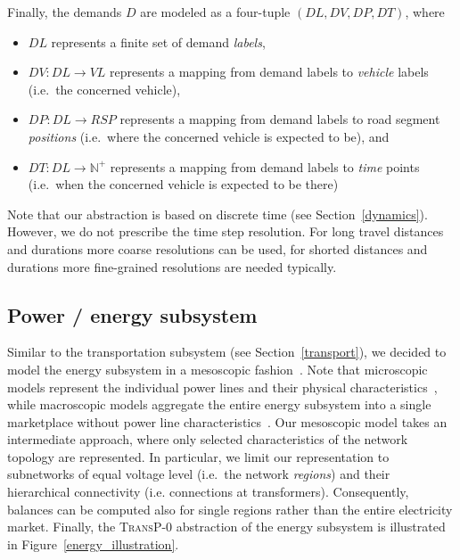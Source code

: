 Finally, the demands $D$ are modeled as a four-tuple $(DL, DV, DP, DT)$, where
\begin{itemize}
	\item $DL$ represents a finite set of demand \textit{labels},
	\item $DV: DL \rightarrow VL$ represents a mapping from demand labels to \textit{vehicle} labels (i.e.\ the concerned vehicle),
	\item $DP: DL \rightarrow RSP$ represents a mapping from demand labels to road segment \textit{positions} (i.e.\ where the concerned vehicle is expected to be), and
	\item $DT: DL \rightarrow \mathbb{N}^+$ represents a mapping from demand labels to \textit{time} points (i.e.\ when the concerned vehicle is expected to be there)
\end{itemize}
Note that our abstraction is based on discrete time (see Section~\ref{dynamics}). However, we do not prescribe the time step resolution. For long travel distances and durations more coarse resolutions can be used, for shorted distances and durations more fine-grained resolutions are needed typically.

\subsection{Power / energy subsystem}
\label{energy_system}

Similar to the transportation subsystem (see Section~\ref{transport}), we decided to model the energy subsystem in a mesoscopic fashion~\cite{Hackenberg2012}. Note that microscopic models represent the individual power lines and their physical characteristics~\cite{Dommel1968}, while macroscopic models aggregate the entire energy subsystem into a single marketplace without power line characteristics~\cite{Castronuovo2004}. Our mesoscopic model takes an intermediate approach, where only selected characteristics of the network topology are represented. In particular, we limit our representation to subnetworks of equal voltage level (i.e.\ the network \textit{regions}) and their hierarchical connectivity (i.e. connections at transformers). Consequently, balances can be computed also for single regions rather than the entire electricity market. Finally, the \textsc{TransP-0} abstraction of the energy subsystem is illustrated in Figure~\ref{energy_illustration}.

